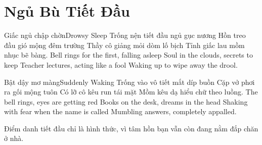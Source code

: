 \chapter{Ngủ Bù Tiết Đầu}

\begin{tutuyetbox}{Giấc ngủ chập chờn}{Drowsy Sleep}
Trống nện tiết đầu ngủ gục nương
Hồn treo đầu gió mộng đêm trường
Thầy cô giảng mỏi dòm lố bịch
Tỉnh giấc lau mồm nhục bẽ bàng.
\tcblower
Bell rings for the first, falling asleep 
Soul in the clouds, secrets to keep 
Teacher lectures, acting like a fool 
Waking up to wipe away the drool.
\end{tutuyetbox}

\begin{tutuyetbox}{Bật dậy mơ màng}{Suddenly Waking}
Trống vào vô tiết mắt díp buồn
Cặp vở phơi ra gối mộng tuôn
Có lỡ cô kêu run tái mặt
Mồm kêu dạ hiểu chữ theo luồng.
\tcblower
The bell rings, eyes are getting red 
Books on the desk, dreams in the head 
Shaking with fear when the name is called 
Mumbling answers, completely appalled.
\end{tutuyetbox}

\begin{ghichu}
Điểm danh tiết đầu chỉ là hình thức, vì tâm hồn bạn vẫn còn đang nằm đắp chăn ở nhà.
\end{ghichu}